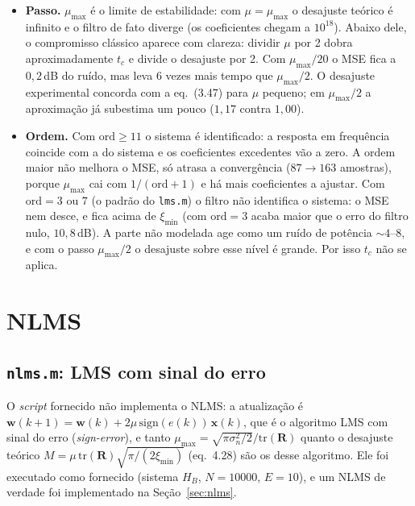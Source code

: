 \documentclass[11pt,a4paper]{article}
\begin{document}
\begin{itemize}\itemsep0pt
  \item \textbf{Passo.} $\mu_{\max}$ é o limite de estabilidade: com $\mu=\mu_{\max}$
        o desajuste teórico é infinito e o filtro de fato diverge (os coeficientes
        chegam a $10^{18}$). Abaixo dele, o compromisso clássico aparece com clareza:
        dividir $\mu$ por 2 dobra aproximadamente $t_c$ e divide o desajuste por 2. Com
        $\mu_{\max}/20$ o MSE fica a $0{,}2$\,dB do ruído, mas leva 6 vezes mais tempo
        que $\mu_{\max}/2$. O desajuste experimental concorda com a eq.~(3.47) para
        $\mu$ pequeno; em $\mu_{\max}/2$ a aproximação já subestima um pouco
        ($1{,}17$ contra $1{,}00$).
  \item \textbf{Ordem.} Com $\text{ord}\ge11$ o sistema é identificado: a resposta em
        frequência coincide com a do sistema e os coeficientes excedentes vão a zero. A
        ordem maior não melhora o MSE, só atrasa a convergência ($87\to163$ amostras),
        porque $\mu_{\max}$ cai com $1/(\text{ord}+1)$ e há mais coeficientes a ajustar.
        Com $\text{ord}=3$ ou $7$ (o padrão do \texttt{lms.m}) o filtro não identifica o
        sistema: o MSE nem desce, e fica acima de $\xi_{\min}$ (com $\text{ord}=3$ acaba
        maior que o erro do filtro nulo, $10{,}8$\,dB). A parte não modelada age como
        um ruído de potência $\sim\!4$--$8$, e com o passo $\mu_{\max}/2$ o desajuste
        sobre esse nível é grande. Por isso $t_c$ não se aplica.
\end{itemize}

\section{NLMS}

\subsection{\texttt{nlms.m}: LMS com sinal do erro}

O \emph{script} fornecido não implementa o NLMS: a atualização é
$\mathbf{w}(k+1) = \mathbf{w}(k) + 2\mu\,\text{sign}(e(k))\,\mathbf{x}(k)$, que é o
algoritmo LMS com sinal do erro (\emph{sign-error}), e tanto
$\mu_{\max} = \sqrt{\pi\sigma_n^2/2}/\text{tr}(\mathbf{R})$ quanto o desajuste teórico
$M = \mu\,\text{tr}(\mathbf{R})\sqrt{\pi/(2\xi_{\min})}$ (eq.~4.28) são os desse
algoritmo. Ele foi executado como fornecido (sistema $H_B$, $N=10000$, $E=10$), e um NLMS
de verdade foi implementado na Seção~\ref{sec:nlms}.
\end{document}
